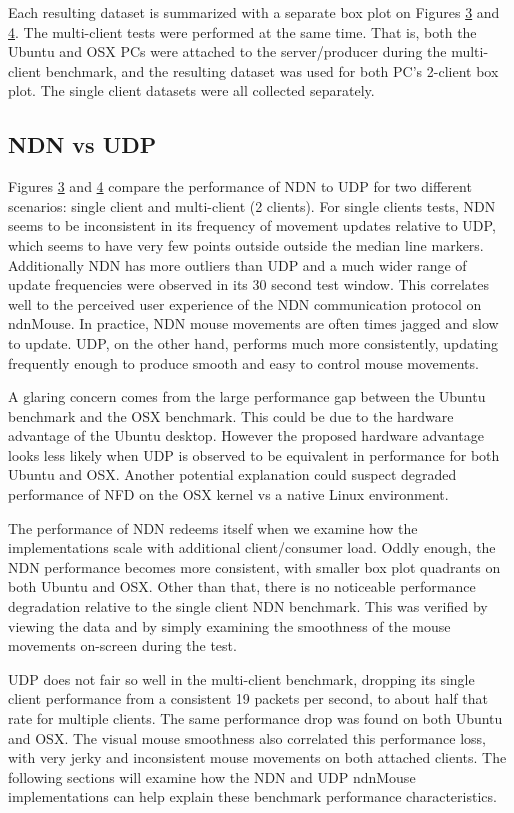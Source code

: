 \documentclass{sig-alternate}
\renewcommand\_{\textunderscore\allowbreak}  %
\begin{document}
Each resulting dataset is summarized with a separate box plot on Figures \hyperlink{fig:ubuntuBenchmark}{3} and \hyperlink{fig:osxBenchmark}{4}. The multi-client tests were performed at the same time. That is, both the Ubuntu and OSX PCs were attached to the server/producer during the multi-client benchmark, and the resulting dataset was used for both PC's 2-client box plot. The single client datasets were all collected separately.

\subsection{NDN vs UDP}
Figures \hyperlink{fig:ubuntuBenchmark}{3} and \hyperlink{fig:osxBenchmark}{4} compare the performance of NDN to UDP for two different scenarios: single client and multi-client (2 clients). For single clients tests, NDN seems to be inconsistent in its frequency of movement updates relative to UDP, which seems to have very few points outside outside the median line markers. Additionally NDN has more outliers than UDP and a much wider range of update frequencies were observed in its 30 second test window. This correlates well to the perceived user experience of the NDN communication protocol on ndnMouse. In practice, NDN mouse movements are often times jagged and slow to update. UDP, on the other hand, performs much more consistently, updating frequently enough to produce smooth and easy to control mouse movements.

A glaring concern comes from the large performance gap between the Ubuntu benchmark and the OSX benchmark. This could be due to the hardware advantage of the Ubuntu desktop. However the proposed hardware advantage looks less likely when UDP is observed to be equivalent in performance for both Ubuntu and OSX. Another potential explanation could suspect degraded performance of NFD on the OSX kernel vs a native Linux environment.

The performance of NDN redeems itself when we examine how the implementations scale with additional client/consumer load. Oddly enough, the NDN performance becomes more consistent, with smaller box plot quadrants on both Ubuntu and OSX. Other than that, there is no noticeable performance degradation relative to the single client NDN benchmark. This was verified by viewing the data and by simply examining the smoothness of the mouse movements on-screen during the test.

UDP does not fair so well in the multi-client benchmark, dropping its single client performance from a consistent 19 packets per second, to about half that rate for multiple clients. The same performance drop was found on both Ubuntu and OSX. The visual mouse smoothness also correlated this performance loss, with very jerky and inconsistent mouse movements on both attached clients. The following sections will examine how the NDN and UDP ndnMouse implementations can help explain these benchmark performance characteristics.
\end{document}
